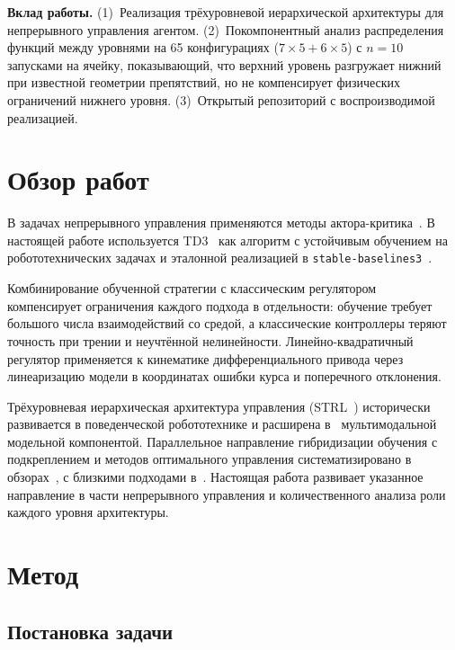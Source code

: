 \documentclass[11pt]{article}
\begin{document}
\textbf{Вклад работы.} (1)~Реализация трёхуровневой иерархической архитектуры для непрерывного управления агентом. (2)~Покомпонентный анализ распределения функций между уровнями на 65 конфигурациях ($7 \times 5 + 6 \times 5$) с $n = 10$ запусками на ячейку, показывающий, что верхний уровень разгружает нижний при известной геометрии препятствий, но не компенсирует физических ограничений нижнего уровня. (3)~Открытый репозиторий с воспроизводимой реализацией.


\section{Обзор работ}
\label{sec:related}

В задачах непрерывного управления применяются методы актора-критика~\cite{lillicrap2016ddpg,fujimoto2018td3,haarnoja2018sac,schulman2017ppo}. В настоящей работе используется TD3~\cite{fujimoto2018td3} как алгоритм с устойчивым обучением на робототехнических задачах и эталонной реализацией в \verb|stable-baselines3|~\cite{raffin2021sb3}.

Комбинирование обученной стратегии с классическим регулятором~\cite{silver2018residual,johannink2019residual} компенсирует ограничения каждого подхода в отдельности: обучение требует большого числа взаимодействий со средой, а классические контроллеры теряют точность при трении и неучтённой нелинейности. Линейно-квадратичный регулятор применяется к кинематике дифференциального привода через линеаризацию модели в координатах ошибки курса и поперечного отклонения.

Трёхуровневая иерархическая архитектура управления (STRL~\cite{gat1998three,kiselev2020dissertation,kiselev2020}) исторически развивается в поведенческой робототехнике и расширена в~\cite{veitsenfeld2024} мультимодальной модельной компонентой. Параллельное направление гибридизации обучения с подкреплением и методов оптимального управления систематизировано в обзорах~\cite{hewing2020lbmpc,brunke2022safe}, с близкими подходами в~\cite{levine2016end,cheng2019control,kahn2018selfsup}. Настоящая работа развивает указанное направление в части непрерывного управления и количественного анализа роли каждого уровня архитектуры.

\section{Метод}
\label{sec:method}

\subsection{Постановка задачи}
\label{sec:problem}
\end{document}
